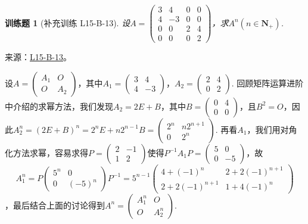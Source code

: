 \documentclass[12pt,fontset=fandol]{ctexart}
\newtheorem{exercise}{训练题}[section]
\begin{document}
\begin{exercise}[补充训练 L15-B-13]\label{prob:L15-B-13}
设$A=\begin{pmatrix}
                3 & 4 & 0 & 0 \\ 4 & -3 & 0 & 0 \\ 0 & 0 & 2 & 4 \\ 0 & 0 & 0 & 2
            \end{pmatrix}$，求$A^n(n\in\mathbf{N}_+)$.
\end{exercise}
\noindent 来源：\href{https://github.com/yhwu-is/Linear-Algebra-Left-Undone/blob/new/%E8%AE%B2%E4%B9%89/%E4%B8%93%E9%A2%98/15%20%E7%9B%B8%E4%BC%BC%E6%A0%87%E5%87%86%E5%BD%A2%EF%BC%9A%E5%A4%8D%E6%95%B0%E5%9F%9F%E4%B8%8A%E7%9A%84%E5%B0%9D%E8%AF%95%E4%B8%8E%E7%90%86%E8%AE%BA.tex}{L15-B-13}。
\begin{solve}
设$A=\begin{pmatrix}
                A_1 & O \\ O & A_2
            \end{pmatrix}$，其中$A_1=\begin{pmatrix}
                3 & 4 \\ 4 & -3
            \end{pmatrix}$，$A_2=\begin{pmatrix}
                2 & 4 \\ 0 & 2
            \end{pmatrix}$. 回顾矩阵运算进阶中介绍的求幂方法，我们发现$A_2=2E+B$，其中$B=\begin{pmatrix}
                0 & 4 \\ 0 & 0
            \end{pmatrix}$，且$B^2=O$，因此$A_2^n=(2E+B)^n=2^nE+n2^{n-1}B=\begin{pmatrix}
                2^n & n2^{n+1} \\ 0 & 2^n
            \end{pmatrix}$. 再看$A_1$，我们用对角化方法求幂，容易求得$P=\begin{pmatrix}
                2 & -1 \\ 1 & 2
            \end{pmatrix}$使得$P^{-1}A_1P=\begin{pmatrix}
                5 & 0 \\ 0 & -5
            \end{pmatrix}$，故
\[A_1^n=P\begin{pmatrix}
                5^n & 0 \\ 0 & (-5)^n
            \end{pmatrix}P^{-1}=5^{n-1}\begin{pmatrix}
                4+(-1)^n & 2+2(-1)^{n+1} \\ 2+2(-1)^{n+1} & 1+4(-1)^n
            \end{pmatrix}\]
，最后结合上面的讨论得到$A^n=\begin{pmatrix}
                A_1^n & O \\ O & A_2^n
            \end{pmatrix}$.
\end{solve}
\end{document}
